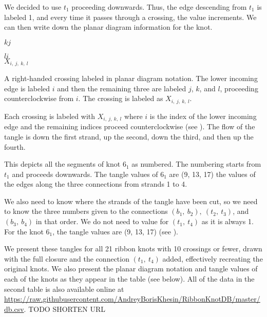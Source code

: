 \begin{paper}
We decided to use $t_1$ proceeding downwards.
Thus, the edge descending from $t_1$ is labeled 1, and every time it passes
through a crossing, the value increments.
We can then write down the planar diagram information for the knot.

{\hspace{0.3in}\hspace{0.175\columnwidth}$k$\hspace{0.4\columnwidth}$j$
\begin{center}\end{center}

\hspace{0.3in}\hspace{0.175\columnwidth}$l$\hspace{0.4\columnwidth}$i$\\

\hspace{0.3in}\hspace{0.31\columnwidth}$X_{i,~j,~k,~l}$}
{A right-handed crossing labeled in planar diagram notation.
The lower incoming edge is labeled $i$ and then the remaining three are
labeled $j$, $k$, and $l$, proceeding counterclockwise from $i$.
The crossing is labeled as $X_{i,~j,~k,~l}$.}

Each crossing is labeled with $X_{i,~j,~k,~l}$ where $i$ is the index of the
lower incoming edge and the remaining indices proceed counterclockwise (see
\figCrossing).
The flow of the tangle is down the first strand, up the second, down the third,
and then up the fourth.

{This depicts all the segments of knot $6_1$ as numbered.
The numbering starts from $t_1$ and proceeds downwards.
The tangle values of $6_1$ are (9, 13, 17) the values of the edges along the
three connections from strands 1 to 4.}

We also need to know where the strands of the tangle have been cut, so we need
to know the three numbers given to the connections $(b_1,~b_2),~(t_2,~t_3)$, and
$(b_3,~b_4)$ in that order.
We do not need to value for $(t_1,~t_4)$ as it is always 1.
For the knot $6_1$, the tangle values are (9, 13, 17) (see \figExample).

We present these tangles for all 21 ribbon knots with 10 crossings or fewer,
drawn with the full closure and the connection $(t_1,~t_4)$ added, effectively
recreating the original knots.
We also present the planar diagram notation and tangle values of each of the
knots as they appear in the table (see below).
All of the data in the second table is also available online at\\
\url{
https://raw.githubusercontent.com/AndreyBorisKhesin/RibbonKnotDB/master/db.csv}.
TODO SHORTEN URL


\end{paper}
